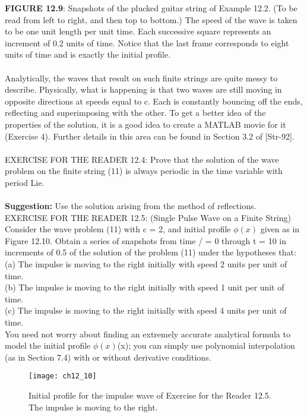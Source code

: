 \documentclass[../main.tex]{subfiles}
\begin{document}
\textbf{FIGURE 12.9}: Snapshots of the plucked guitar string of Example 12.2. (To be read from 
left to right, and then top to bottom.) The speed of the wave is taken to be one unit length 
per unit time. Each successive square represents an increment of 0.2 units of time. Notice 
that the last frame corresponds to eight units of time and is exactly the initial profile. 
\\
\\
Analytically, the waves that result on such finite strings are quite messy to 
describe. Physically, what is happening is that two waves are still moving in 
opposite directions at speeds equal to c. Each is constantly bouncing off the ends, 
reflecting and superimposing with the other. To get a better idea of the properties of the solution, it is a good idea to create a MATLAB movie for it (Exercise 4). 
Further details in this area can be found in Section 3.2 of [Str-92].
\\
\\
EXERCISE FOR THE READER 12.4: Prove that the solution of the wave 
problem on the finite string (11) is always periodic in the time variable with period 
Lie.\\
\\
\textbf{Suggestion:} Use the solution arising from the method of reflections.\\
EXERCISE FOR THE READER 12.5: (Single Pulse Wave on a Finite String) 
Consider the wave problem (11) with c = 2, and initial profile $\phi(x)$ given as in 
Figure 12.10. Obtain a series of snapshots from time / = 0 through t = 10 in 
increments of 0.5 of the solution of the problem (11) under the hypotheses that:  
\\
(a) The impulse is moving to the right initially with speed 2 units per unit of time.
\\ 
(b) The impulse is moving to the right initially with speed 1 unit per unit of time.
\\ 
(c) The impulse is moving to the right initially with speed 4 units per unit of time.
\\
You need not worry about finding an extremely accurate analytical formula to 
model the initial profile  $\phi(x)$(x); you can simply use polynomial interpolation (as in 
Section 7.4) with or without derivative conditions. 
\begin{figure}[H]
	\centering
	\texttt{[image: ch12\_10]}
	\caption{\textsf{Initial profile for the impulse wave of Exercise for the Reader 12.5. The 
impulse is moving to the right. }}
	\label{pfig:ch12_10}
\end{figure}
\end{document}
